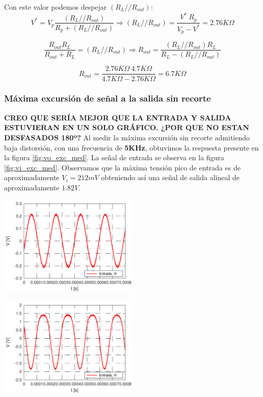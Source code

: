 \documentclass[a4paper, 10pt, spanish]{article}
\begin{document}
Con este valor podemos despejar $(R_L//R_{out})$:
\begin{equation}
  V^*=V_p \frac{(R_L//R_{out})}{R_p + (R_L//R_{out})} \Rightarrow (R_L//R_{out}) = \frac{V^*\ R_p}{V_p-V^*} = 2.76K\Omega
\end{equation}

\begin{equation}
  \frac{R_{out}R_L}{R_{out}+R_L} = (R_L//R_{out})  \Rightarrow R_{out}=\frac{(R_L//R_{out}) R_L}{R_L - (R_L//R_{out})}
\end{equation}

\begin{equation}
  R_{out}=\frac{2.76K\Omega\ 4.7K\Omega}{4.7K\Omega - 2.76K\Omega}=6.7K\Omega
\end{equation}

\subsubsection{Máxima excursión de señal a la salida sin recorte}
\textbf{CREO QUE SERÍA MEJOR QUE LA ENTRADA Y SALIDA ESTUVIERAN EN UN SOLO GRÁFICO. ¿POR QUE NO ESTAN DESFASADOS 180º?}
Al medir la máxima excursión sin recorte admitiendo baja distorsión, con una frecuencia de \textbf{5KHz}, obtuvimos la respuesta presente en la figura \ref{fig:vo_exc_med}. La señal de entrada se observa en la figura \ref{fig:vi_exc_med}. Observamos que la máxima tensión pico de entrada es de aproximadamente $V_i=212mV$ obteniendo así una señal de salida alineal de aproximadamente $1.82V$.

\begin{center}
  \includegraphics[width=0.5\textwidth]{vi3.png}
  \label{fig:vi_exc_med}
\end{center}

\begin{center}
  \includegraphics[width=0.5\textwidth]{vo3.png}
  \label{fig:vo_exc_med}
\end{center}
\end{document}
